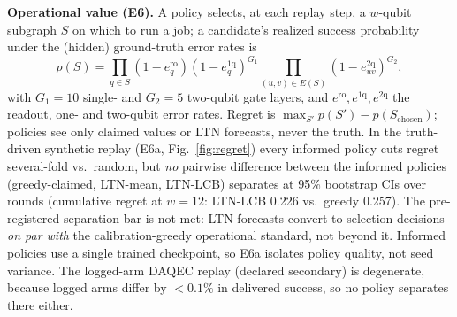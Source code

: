 \documentclass[journal]{IEEEtran}
\begin{document}
\textbf{Operational value (E6).} A policy selects, at each replay step, a
$w$-qubit subgraph $S$ on which to run a job; a candidate's realized success
probability under the (hidden) ground-truth error rates is
\begin{equation}\label{eq:jobsuccess}
p(S) = \!\prod_{q\in S}\!(1-e^{\mathrm{ro}}_q)(1-e^{\mathrm{1q}}_q)^{G_1}
       \!\!\prod_{(u,v)\in E(S)}\!\!(1-e^{\mathrm{2q}}_{uv})^{G_2},
\end{equation}
with $G_1{=}10$ single- and $G_2{=}5$ two-qubit gate layers, and $e^{\mathrm{ro}},
e^{\mathrm{1q}}, e^{\mathrm{2q}}$ the readout, one- and two-qubit error rates.
Regret is $\max_{S'}p(S')-p(S_{\text{chosen}})$; policies see only claimed values
or LTN forecasts, never the truth. In the truth-driven synthetic replay (E6a,
Fig.~\ref{fig:regret}) every informed policy cuts regret several-fold
vs.\ random, but \emph{no} pairwise difference between the informed policies
(greedy-claimed, LTN-mean, LTN-LCB) separates at 95\% bootstrap CIs over rounds
(cumulative regret at $w{=}12$: LTN-LCB 0.226 vs.\ greedy
0.257). The pre-registered separation bar is not met: LTN
forecasts convert to selection decisions \emph{on par with} the
calibration-greedy operational standard, not beyond it. Informed policies use a
single trained checkpoint, so E6a isolates policy quality, not seed variance. The
logged-arm DAQEC
replay (declared secondary) is degenerate, because logged arms differ by $<0.1\%$ in
delivered success, so no policy separates there either.
\end{document}
